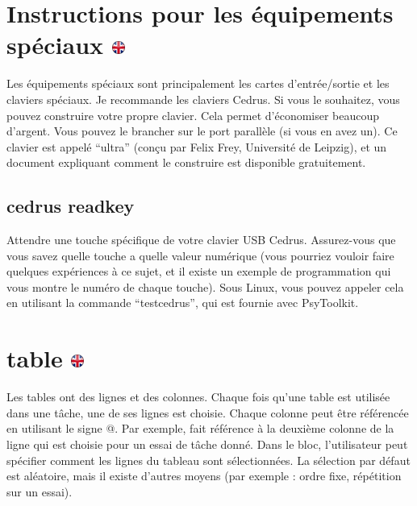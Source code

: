 \documentclass[
]{book}
\begin{document}
\hypertarget{instructions-pour-les-uxe9quipements-spuxe9ciaux}{%
\section[Instructions pour les équipements spéciaux ]{\texorpdfstring{Instructions pour les équipements spéciaux \href{https://www.psytoolkit.org/doc3.4.0/syntax.html\#_instructions_for_special_equipment}{\protect\includegraphics{img/ukflag.png}}}{Instructions pour les équipements spéciaux }}\label{instructions-pour-les-uxe9quipements-spuxe9ciaux}}

Les équipements spéciaux sont principalement les cartes d'entrée/sortie et les claviers spéciaux. Je recommande les claviers Cedrus. Si vous le souhaitez, vous pouvez construire votre propre clavier. Cela permet d'économiser beaucoup d'argent. Vous pouvez le brancher sur le port parallèle (si vous en avez un). Ce clavier est appelé ``ultra'' (conçu par Felix Frey, Université de Leipzig), et un document expliquant comment le construire est disponible gratuitement.

\hypertarget{cedrusreadkey}{%
\subsection{cedrus readkey}\label{cedrusreadkey}}

Attendre une touche spécifique de votre clavier USB Cedrus. Assurez-vous que vous savez quelle touche a quelle valeur numérique (vous pourriez vouloir faire quelques expériences à ce sujet, et il existe un exemple de programmation qui vous montre le numéro de chaque touche). Sous Linux, vous pouvez appeler cela en utilisant la commande ``testcedrus'', qui est fournie avec PsyToolkit.

\hypertarget{table-1}{%
\section[table ]{\texorpdfstring{table \href{https://www.psytoolkit.org/doc3.4.0/syntax.html\#table}{\protect\includegraphics{img/ukflag.png}}}{table }}\label{table-1}}

Les tables ont des lignes et des colonnes. Chaque fois qu'une table est utilisée dans une tâche, une de ses lignes est choisie. Chaque colonne peut être référencée en utilisant le signe @. Par exemple, \citet{2} fait référence à la deuxième colonne de la ligne qui est choisie pour un essai de tâche donné. Dans le bloc, l'utilisateur peut spécifier comment les lignes du tableau sont sélectionnées. La sélection par défaut est aléatoire, mais il existe d'autres moyens (par exemple : ordre fixe, répétition sur un essai).
\end{document}
